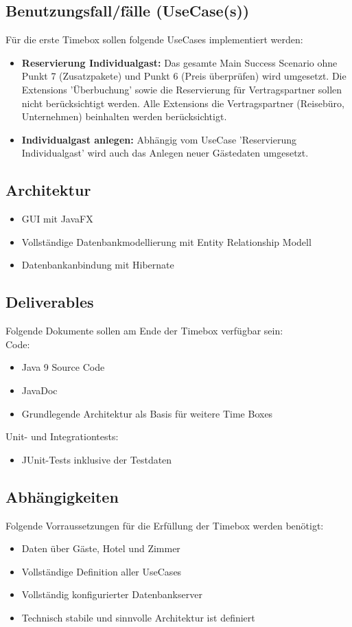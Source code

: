 \documentclass[../Pflichtenheft.tex]{subfiles}
\begin{document}
    \subsection{Benutzungsfall/fälle (UseCase(s)) }
        Für die erste Timebox sollen folgende UseCases implementiert werden:
        \begin{itemize}
            \item \textbf{Reservierung Individualgast: } Das gesamte Main Success Scenario ohne Punkt
            7 (Zusatzpakete) und Punkt 6 (Preis überprüfen) wird umgesetzt. Die Extensions 'Überbuchung'
            sowie die Reservierung für Vertragspartner sollen nicht berücksichtigt werden. Alle Extensions die
            Vertragspartner (Reisebüro, Unternehmen) beinhalten werden berücksichtigt.
            \item \textbf{Individualgast anlegen: } Abhängig vom UseCase 'Reservierung Individualgast' wird
            auch das Anlegen neuer Gästedaten umgesetzt.
        \end{itemize}
    \subsection{Architektur}
    \begin{itemize}
        \item GUI mit JavaFX
        \item Vollständige Datenbankmodellierung mit Entity Relationship Modell
        \item Datenbankanbindung mit Hibernate
    \end{itemize}
    \subsection{Deliverables}
    Folgende Dokumente sollen am Ende der Timebox verfügbar sein: \\
    Code:
    \begin{itemize}
        \item Java 9 Source Code
        \item JavaDoc
        \item Grundlegende Architektur als Basis für weitere Time Boxes
    \end{itemize}
    Unit- und Integrationtests:
    \begin{itemize}
        \item JUnit-Tests inklusive der Testdaten
    \end{itemize}
    \subsection{Abhängigkeiten}
    Folgende Vorraussetzungen für die Erfüllung der Timebox werden benötigt:
    \begin{itemize}
        \item Daten über Gäste, Hotel und Zimmer
        \item Vollständige Definition aller UseCases
        \item Vollständig konfigurierter Datenbankserver
        \item Technisch stabile und sinnvolle Architektur ist definiert
    \end{itemize}
\end{document}
